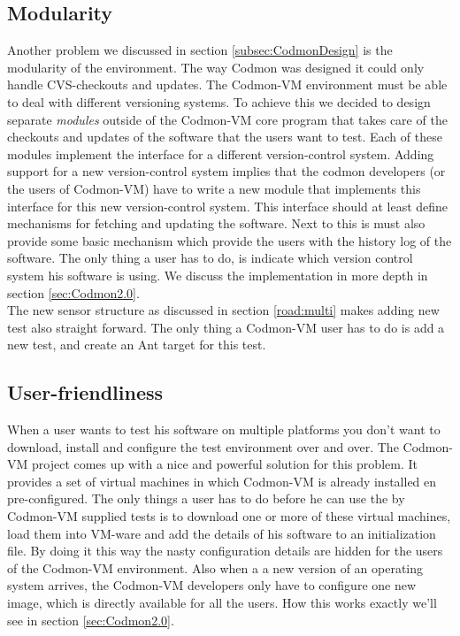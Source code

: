 \documentclass{article}
\newcommand{\project}{Codmon-VM}
\begin{document}
\subsection{Modularity}
\label{road:modular}
Another problem we discussed in section \ref{subsec:CodmonDesign} is the modularity of the environment. The way Codmon was designed it could only handle CVS-checkouts and updates. The \project{} 
environment must be able to deal with different versioning systems. To achieve this we decided to design separate \emph{modules} outside of the \project{} core program that takes care of the checkouts and updates of the 
software that the users want to test. Each of these modules implement the interface for a different version-control system. Adding support for a new version-control system implies that the codmon developers 
(or the users of \project{}) have to write a new module that implements this interface for this new version-control system. This interface should at least define mechanisms for fetching and updating the 
software. Next to this is must also provide some basic mechanism which provide the users with the history log of the software. The only thing a user has to do, is indicate which version control system his 
software is using. We discuss the implementation in more depth in section \ref{sec:Codmon2.0}.\\

\noindent The new sensor structure as discussed in section \ref{road:multi} makes adding new test also straight forward. The only thing a \project{} user has to do is add a new test, and create an Ant target 
for this test. 

\subsection{User-friendliness}
\label{road:user}
When a user wants to test his software on multiple platforms you don't want to download, install and configure the test environment over and over. The \project{} project comes up with a nice and powerful 
solution for this problem. It provides a set of virtual machines in which \project{} is already installed en pre-configured. The only things a user has to do before he can use the by \project{} supplied tests is
to download one or more of these virtual machines, load them into VM-ware and add the details of his software to an initialization file. By doing it this way the nasty configuration details are hidden for the users of the 
\project{} environment. Also when a a new version of an operating system arrives, the \project{} developers only have to configure one new image, which is directly available for all the users. How this works 
exactly we'll see in section \ref{sec:Codmon2.0}. 
\end{document}
